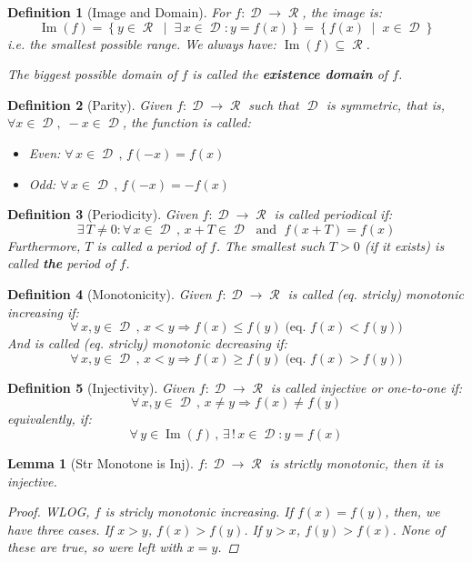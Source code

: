 \documentclass[12pt]{article}
\let\RA\Rightarrow
\newcommand{\set}[2]{\left\{{#1}\;\middle|\;{#2}\right\}}
\newcommand{\Forall}[1]{\forall\,{#1}\,,\,}
\newcommand{\Exist}[1]{\exists\,{#1}:}
\DeclareMathOperator{\D}{\mathcal{D}}
\DeclareMathOperator{\Ran}{\mathcal{R}}
\DeclareMathOperator{\Image}{Im}
\newtheorem{definition}{Definition}[subsection]
\newtheorem{lemma}{Lemma}[subsection]
\begin{document}
\begin{definition}[Image and Domain]
  For $f:\D\to\Ran$, the image is:
  $$\Image(f)=\set{y\in\Ran}{\Exist{x\in\D} y=f(x)}=\set{f(x)}{x\in\D}
  $$
  i.e. the smallest possible range. We always have: $\Image(f)\subseteq\Ran$.

  The biggest possible domain of $f$ is called the \textbf{existence domain} of $f$.
\end{definition}

\begin{definition}[Parity]
  Given $f:\D\to\Ran$ such that $\D$ is symmetric, that is, $\forall x\in\D,\;-x\in\D$, the function is called:
  \begin{itemize}
    \item Even: $\Forall{x\in \D} f(-x)=f(x)$
    \item Odd: $\Forall{x\in \D} f(-x)=-f(x)$
  \end{itemize}
\end{definition}

\begin{definition}[Periodicity]
  Given $f:\D\to\Ran$ is called periodical if:
  $$\Exist{T\neq 0}\Forall{x\in\D} x+T\in\D\;\text{ and }\;f(x+T)=f(x)$$
  Furthermore, $T$ is called a period of $f$. The smallest such $T>0$ (if it exists) is called \textbf{the} period of $f$.
\end{definition}

\begin{definition}[Monotonicity]
  Given $f:\D\to\Ran$ is called (eq. stricly) monotonic increasing if:
  $$\Forall{x,y\in\D} x<y\RA f(x)\leq f(y)\;\big(\text{eq. }f(x)<f(y)\big)$$
  And is called (eq. stricly) monotonic decreasing if:
  $$\Forall{x,y\in\D} x<y\RA f(x)\geq f(y)\;\big(\text{eq. }f(x)>f(y)\big)$$
\end{definition}

\begin{definition}[Injectivity]
  Given $f:\D\to\Ran$ is called injective or one-to-one if:
  $$\Forall{x,y\in\D} x\neq y\RA f(x)\neq f(y)$$
  equivalently, if:
  $$\Forall{y\in\Image(f)}\Exist{!\,x\in\D}y=f(x)$$
\end{definition}

\begin{lemma}[Str Monotone is Inj]
  $f:\D\to\Ran$ is strictly monotonic, then it is injective.
  \begin{proof}
    WLOG, $f$ is stricly monotonic increasing. If $f(x)=f(y)$, then, we have three cases. If $x>y$, $f(x)>f(y)$. If $y>x$, $f(y)>f(x)$. None of these are true, so were left with $x=y$.
  \end{proof}
\end{lemma}
\end{document}
